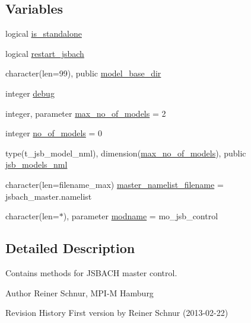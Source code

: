 \subsection*{Variables}
\begin{DoxyCompactItemize}
\item 
logical \hyperlink{namespacemo__jsb__control_a4c3add7c94bf9c3fe06ae03bdf9ff1ae}{is\+\_\+standalone}
\item 
logical \hyperlink{namespacemo__jsb__control_a569426bef03961a0e9a5acdf77ddf11a}{restart\+\_\+jsbach}
\item 
character(len=99), public \hyperlink{namespacemo__jsb__control_a7011bd39debd8f5806d4da9947ac38a6}{model\+\_\+base\+\_\+dir}
\item 
integer \hyperlink{namespacemo__jsb__control_a0e797e67df861f0d9dfeb330c5a4fedd}{debug}
\item 
integer, parameter \hyperlink{namespacemo__jsb__control_a8926f94cca1021902c183b3f31c1bb7f}{max\+\_\+no\+\_\+of\+\_\+models} = 2
\item 
integer \hyperlink{namespacemo__jsb__control_ae6883b2aa250bb4b2e2e8ef2d4edea31}{no\+\_\+of\+\_\+models} = 0
\item 
type(t\+\_\+jsb\+\_\+model\+\_\+nml), dimension(\hyperlink{namespacemo__jsb__control_a8926f94cca1021902c183b3f31c1bb7f}{max\+\_\+no\+\_\+of\+\_\+models}), public \hyperlink{namespacemo__jsb__control_a71f0482fffea3f64acb60c7821436357}{jsb\+\_\+models\+\_\+nml}
\item 
character(len=filename\+\_\+max) \hyperlink{namespacemo__jsb__control_aa607eb23b5df0ed6a04c5163cb0cc82f}{master\+\_\+namelist\+\_\+filename} = \textquotesingle{}jsbach\+\_\+master.\+namelist\textquotesingle{}
\item 
character(len=$\ast$), parameter \hyperlink{namespacemo__jsb__control_aa28a5f0f9a2b85b29e9641a4bc9cd187}{modname} = \textquotesingle{}mo\+\_\+jsb\+\_\+control\textquotesingle{}
\end{DoxyCompactItemize}


\subsection{Detailed Description}
Contains methods for J\+S\+B\+A\+C\+H master control. 

\begin{DoxyAuthor}{Author}
Reiner Schnur, M\+P\+I-\/\+M Hamburg
\end{DoxyAuthor}
\begin{DoxyParagraph}{Revision History}
First version by Reiner Schnur (2013-\/02-\/22) 
\end{DoxyParagraph}


